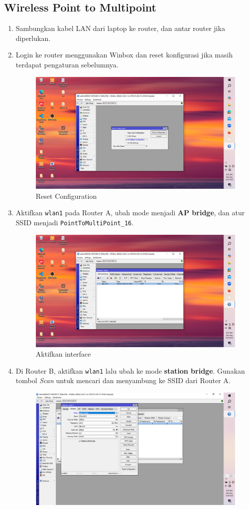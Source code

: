 \subsection{Wireless Point to Multipoint}
\begin{enumerate}
    \item Sambungkan kabel LAN dari laptop ke router, dan antar router jika diperlukan.
    \item Login ke router menggunakan Winbox dan reset konfigurasi jika masih terdapat pengaturan sebelumnya.
    \begin{figure}[H]
        \centering
        \includegraphics[width=0.5\linewidth]{P1/img/1.jpeg}
        \caption{Reset Configuration}
        \label{fig:gambar4}
    \end{figure}
    \item Aktifkan \texttt{wlan1} pada Router A, ubah mode menjadi \textbf{AP bridge}, dan atur SSID menjadi \texttt{PointToMultiPoint\_16}.
    \begin{figure}[H]
        \centering
        \includegraphics[width=0.5\linewidth]{P1/img/3.jpeg}
        \caption{Aktifkan interface}
        \label{fig:gambar4}
    \end{figure}
    \item Di Router B, aktifkan \texttt{wlan1} lalu ubah ke mode \textbf{station bridge}. Gunakan tombol \textit{Scan} untuk mencari dan menyambung ke SSID dari Router A.
    \begin{figure}[H]
        \centering
        \includegraphics[width=0.5\linewidth]{P1/img/11.jpeg}

\end{figure}
\end{enumerate}

